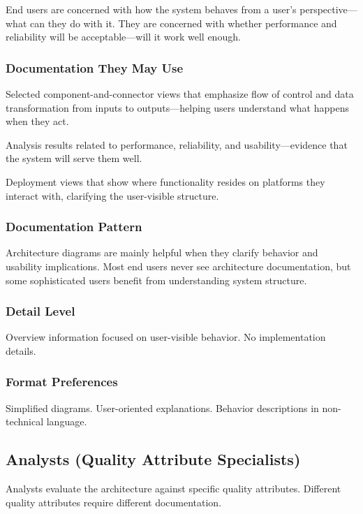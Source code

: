 \documentclass[11pt]{article}
\begin{document}
End users are concerned with how the system behaves from a user's perspective---what can they do with it. They are concerned with whether performance and reliability will be acceptable---will it work well enough.

\subsubsection{Documentation They May Use}

Selected component-and-connector views that emphasize flow of control and data transformation from inputs to outputs---helping users understand what happens when they act.

Analysis results related to performance, reliability, and usability---evidence that the system will serve them well.

Deployment views that show where functionality resides on platforms they interact with, clarifying the user-visible structure.

\subsubsection{Documentation Pattern}

Architecture diagrams are mainly helpful when they clarify behavior and usability implications. Most end users never see architecture documentation, but some sophisticated users benefit from understanding system structure.

\subsubsection{Detail Level}

Overview information focused on user-visible behavior. No implementation details.

\subsubsection{Format Preferences}

Simplified diagrams. User-oriented explanations. Behavior descriptions in non-technical language.

\subsection{Analysts (Quality Attribute Specialists)}

Analysts evaluate the architecture against specific quality attributes. Different quality attributes require different documentation.
\end{document}
